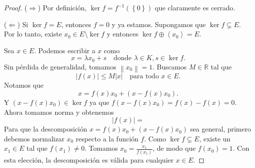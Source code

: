 \begin{proof}
	($\Rightarrow$) Por definición, $\ker f = f^{-1}(\left\{ 0 \right\})$ que claramente es cerrado.

	($\Leftarrow$) Si $\ker f = E$, entonces $f = 0$ y ya estamos. Supongamos que $\ker f \subsetneq E$. Por lo tanto, existe $x_0 \in E \setminus \ker f$ y entonces $\ker f \oplus \left\langle x_0 \right\rangle = E$.

	Sea $x \in E$. Podemos escribir a $x$ como
	\begin{equation*}
		x = \lambda x_0 + s \quad \text{donde } \lambda \in K, s \in \ker f.
	\end{equation*}
	Sin pérdida de generalidad, tomamos $\left\lVert x_0 \right\rVert = 1$.
	Buscamos $M \in \mathbb{R}$ tal que
	\begin{equation*}
		\left\lvert f(x) \right\rvert \leq M \left\lvert x \right\rvert \quad \text{para todo }x \in E.
	\end{equation*}
	Notamos que
	\begin{equation*}
		x = f(x) x_0 + (x - f(x) x_0).
	\end{equation*}
	Y $(x - f(x) x_0) \in \ker f$ ya que $f(x - f(x) x_0) = f(x) - f(x) = 0$. Ahora tomamos norma y obtenemos
	\begin{equation*}
		\left\lvert f(x) \right\rvert =
	\end{equation*}
	Para que la descomposición $x = f(x) x_0 + (x - f(x) x_0)$ sea general, primero debemos normalizar $x_0$ respecto a la función $f$. Como $\ker f \subsetneq E$, existe un $x_1 \in E$ tal que $f(x_1) \ne 0$. Tomamos $x_0 = \frac{x_1}{f(x_1)}$, de modo que $f(x_0) = 1$. Con esta elección, la descomposición es válida para cualquier $x \in E$.


\end{proof}
